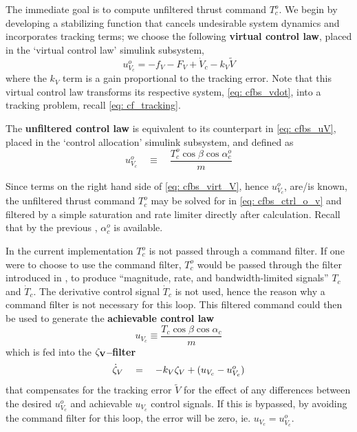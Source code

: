 \documentclass[12pt]{ucthesis}
\begin{document}
The immediate goal is to compute unfiltered thrust command $T^o_c$. We begin by developing a stabilizing function that cancels undesirable system dynamics and incorporates tracking terms; we choose the following \textbf{virtual control law}, placed in the `virtual control law' simulink subsystem,
	\begin{equation}
		\label{eq: cfbs_virt_V}	u^{o}_{V_c} = -f_{V} - F_{V} + \dot{V}_c - k_{V}\tilde{V} 
	\end{equation}
where the $k_V$ term is a gain proportional to the tracking error. Note that this virtual control law transforms its respective system, \ref{eq: cfbs_vdot}, into a tracking problem, recall \autoref{eq: cf_tracking}.

The \textbf{unfiltered control law} is equivalent to its counterpart in \autoref{eq: cfbs_uV}, placed in the `control allocation' simulink subsystem, and defined as
	\begin{equation}
		\label{eq: cfbs_ctrl_o_v}	u^{o}_{V_c} \quad \equiv \quad \frac{T^o_c\cos\beta\cos\alpha^o_c}{m}
	\end{equation} %

Since terms on the right hand side of \autoref{eq: cfbs_virt_V}, hence $u^{o}_{V_c}$, are/is known, the unfiltered thrust command $T^o_c$ may be solved for in \autoref{eq: cfbs_ctrl_o_v} and filtered by a simple saturation and rate limiter directly after calculation. Recall that by the previous , $\alpha^o_c$ is available.

In the current implementation $T^o_c$ is not passed through a command filter. If one were to choose to use the command filter, $T^o_c$ would be passed through the filter introduced in , to produce ``magnitude, rate, and bandwidth-limited signals'' $T_c$ and $\dot{T}_c$. The derivative control signal $\dot{T}_c$ is not used, hence the reason why a command filter is not necessary for this loop. This filtered command could then be used to generate the \textbf{achievable control law}
	\begin{equation}
			u_{V_c} \equiv \frac{T_c \cos\beta\cos\alpha_c}{m}
			\label{eq: cfbs_ctrl_V}
	\end{equation}
which is fed into the $\mathbf{\zeta_V}$\textbf{--filter}
	\begin{equation}
		\label{eq: cfbs_filt_V}	\dot{\zeta}_{V} \quad=\quad -k_{V} \zeta_{V} + (u_{V_c} - u^o_{V_c})
	\end{equation}
that compensates for the tracking error $\tilde{V}$ for the effect of any differences between the desired $u^o_{V_c}$ and achievable $u_{V_c}$ control signals. If this is bypassed, by avoiding the command filter for this loop, the error will be zero, ie. $u_{V_c} = u^o_{V_c}$.
\end{document}
